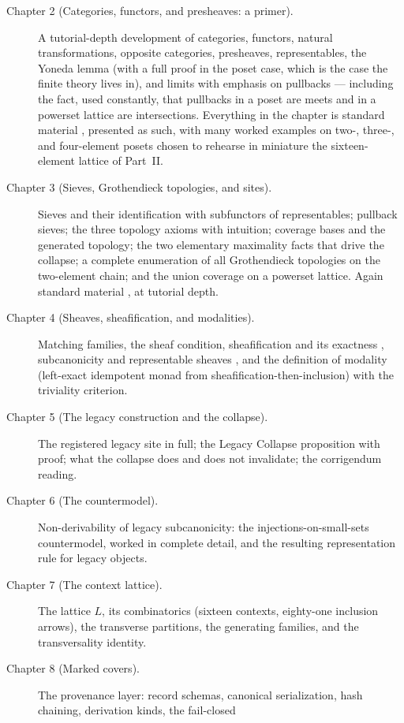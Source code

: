 \begin{description}
\item[Chapter 2 (Categories, functors, and presheaves: a primer).] A
tutorial-depth development of categories, functors, natural transformations,
opposite categories, presheaves, representables, the Yoneda lemma (with a
full proof in the poset case, which is the case the finite theory lives in),
and limits with emphasis on pullbacks --- including the fact, used
constantly, that pullbacks in a poset are meets and in a powerset lattice
are intersections. Everything in the chapter is standard material
\cite{awodey,riehl,maclanecwm,maclane}, presented as such, with many worked
examples on two-, three-, and four-element posets chosen to rehearse in
miniature the sixteen-element lattice of Part~II.
\item[Chapter 3 (Sieves, Grothendieck topologies, and sites).] Sieves and
their identification with subfunctors of representables; pullback sieves;
the three topology axioms with intuition; coverage bases and the generated
topology; the two elementary maximality facts that drive the collapse; a
complete enumeration of all Grothendieck topologies on the two-element
chain; and the union coverage on a powerset lattice. Again standard
material \cite{maclane,stacks00ZC,johnstone}, at tutorial depth.
\item[Chapter 4 (Sheaves, sheafification, and modalities).] Matching
families, the sheaf condition, sheafification and its exactness
\cite{stacks00W1}, subcanonicity and representable sheaves
\cite{stacks00WO}, and the definition of modality (left-exact idempotent
monad from sheafification-then-inclusion) with the triviality criterion.
\item[Chapter 5 (The legacy construction and the collapse).] The registered
legacy site in full; the Legacy Collapse proposition with proof; what the
collapse does and does not invalidate; the corrigendum reading.
\item[Chapter 6 (The countermodel).] Non-derivability of legacy
subcanonicity: the injections-on-small-sets countermodel, worked in
complete detail, and the resulting representation rule for legacy objects.
\item[Chapter 7 (The context lattice).] The lattice $L$, its
combinatorics (sixteen contexts, eighty-one inclusion arrows), the
transverse partitions, the generating families, and the transversality
identity.
\item[Chapter 8 (Marked covers).] The provenance layer: record schemas,
canonical serialization, hash chaining, derivation kinds, the fail-closed

\end{description}
